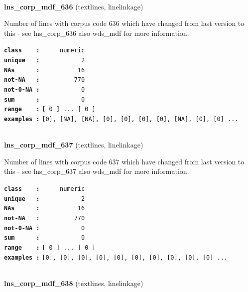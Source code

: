 \documentclass[]{article}
\begin{document}
~

\textbf{lns\_corp\_mdf\_636} (textlines, linelinkage)

Number of lines with corpus code 636 which have changed from last
version to this - see lns\_corp\_636 also wds\_mdf for more information.

\textbf{\texttt{class\ \ \ \ :}} \texttt{~~~~~numeric}\\
\textbf{\texttt{unique\ \ \ :}} \texttt{~~~~~~~~~~~2}\\
\textbf{\texttt{NAs\ \ \ \ \ \ :}} \texttt{~~~~~~~~~~16}\\
\textbf{\texttt{not-NA\ \ \ :}} \texttt{~~~~~~~~~770}\\
\textbf{\texttt{not-0-NA\ :}} \texttt{~~~~~~~~~~~0}\\
\textbf{\texttt{sum\ \ \ \ \ \ :}} \texttt{~~~~~~~~~~~0}\\
\textbf{\texttt{range\ \ \ \ :}}
\texttt{{[}\ 0\ {]}\ ...\ {[}\ 0\ {]}}\\
\textbf{\texttt{examples\ :}}
\texttt{{[}0{]},\ {[}NA{]},\ {[}NA{]},\ {[}0{]},\ {[}0{]},\ {[}0{]},\ {[}0{]},\ {[}NA{]},\ {[}0{]},\ {[}0{]}\ ...}\\

~

\textbf{lns\_corp\_mdf\_637} (textlines, linelinkage)

Number of lines with corpus code 637 which have changed from last
version to this - see lns\_corp\_637 also wds\_mdf for more information.

\textbf{\texttt{class\ \ \ \ :}} \texttt{~~~~~numeric}\\
\textbf{\texttt{unique\ \ \ :}} \texttt{~~~~~~~~~~~2}\\
\textbf{\texttt{NAs\ \ \ \ \ \ :}} \texttt{~~~~~~~~~~16}\\
\textbf{\texttt{not-NA\ \ \ :}} \texttt{~~~~~~~~~770}\\
\textbf{\texttt{not-0-NA\ :}} \texttt{~~~~~~~~~~~0}\\
\textbf{\texttt{sum\ \ \ \ \ \ :}} \texttt{~~~~~~~~~~~0}\\
\textbf{\texttt{range\ \ \ \ :}}
\texttt{{[}\ 0\ {]}\ ...\ {[}\ 0\ {]}}\\
\textbf{\texttt{examples\ :}}
\texttt{{[}0{]},\ {[}0{]},\ {[}0{]},\ {[}0{]},\ {[}0{]},\ {[}0{]},\ {[}0{]},\ {[}0{]},\ {[}0{]},\ {[}0{]}\ ...}\\

~

\textbf{lns\_corp\_mdf\_638} (textlines, linelinkage)
\end{document}
